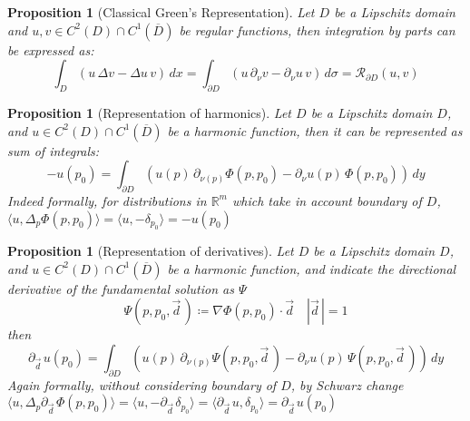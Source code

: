 \documentclass[10pt, a4paper, twoside, openright]{book}
\theoremstyle{definition}
\theoremstyle{plain}
\theoremstyle{plain}
\theoremstyle{plain}
\newtheorem{proposition}[subsection]{Proposition}
\theoremstyle{plain}
\theoremstyle{plain}
\theoremstyle{plain}
\theoremstyle{plain}
\theoremstyle{plain}
\begin{document}
\begin{proposition}[Classical Green's Representation]
 Let $D$ be a Lipschitz domain and $u,v \in C^2(D)\cap C^1(\overline{D})$ be regular functions, then integration by parts can be expressed as:
  \begin{equation}
  \int_D (u \, \Delta v - \Delta u \, v)\, dx = \int_{\partial D}(u \, \partial_\nu v - \partial_\nu u \, v)\,d\sigma = \mathcal{R}_{\partial D}(u,v)
  \end{equation}
\end{proposition}
\begin{proposition}[Representation of harmonics]
 Let $D$ be a Lipschitz domain $D$, and $u \in C^2(D)\cap C^1(\overline{D})$ be a harmonic function, then it can be represented as sum of integrals:
  \begin{equation}
  - u(p_0) = \int_{\partial D}(u(p) \, \partial_{\nu(p)} \Phi(p,p_0) - \partial_\nu u(p) \, \Phi(p,p_0))\,dy
  \end{equation}
 Indeed formally, for distributions in $\mathbb{R}^m$ which take in account boundary of $D$, $\langle u,\Delta_p\Phi(p,p_0)\rangle = \langle u,-\delta_{p_0}\rangle = - u(p_0)$
\end{proposition}
\begin{proposition}[Representation of derivatives]
 \label{prop:repr-deriv}
 Let $D$ be a Lipschitz domain $D$, and $u \in C^2(D)\cap C^1(\overline{D})$ be a harmonic function, and indicate the directional derivative of the fundamental solution as $\Psi$
  \begin{equation}
   \Psi(p,p_0,\vec{d}\,) \coloneqq\nabla\Phi(p,p_0)\cdot\vec{d} \quad |\vec{d}\,|=1
  \end{equation}
 then
  \begin{equation}
  \partial_{\vec{d}\,}u(p_0) = \int_{\partial D}(u(p) \, \partial_{\nu(p)} \Psi(p,p_0,\vec{d}\,) - \partial_\nu u(p) \, \Psi(p,p_0,\vec{d}\,))\,dy
  \end{equation}
 Again formally, without considering boundary of $D$, by Schwarz change $\langle u,\Delta_p\partial_{\vec{d}\,}\Phi(p,p_0)\rangle = \langle u,-\partial_{\vec{d}\,}\delta_{p_0}\rangle = \langle \partial_{\vec{d}\,}u,\delta_{p_0}\rangle = \partial_{\vec{d}\,}u(p_0)$
\end{proposition}
\end{document}
